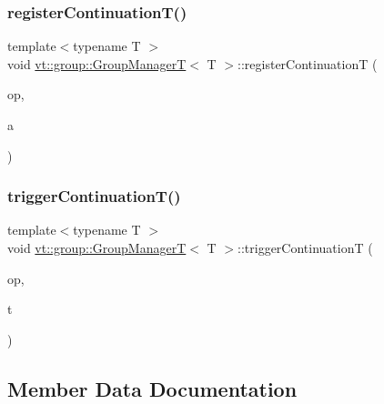 \subsubsection{\texorpdfstring{register\+Continuation\+T()}{registerContinuationT()}\hspace{0.1cm}{\footnotesize\ttfamily [2/2]}}
{\footnotesize\ttfamily template$<$typename T $>$ \\
void \hyperlink{structvt_1_1group_1_1_group_manager_t}{vt\+::group\+::\+Group\+ManagerT}$<$ T $>$\+::register\+ContinuationT (\begin{DoxyParamCaption}\item[{\hyperlink{namespacevt_1_1group_a73f2624ddeb535b39a08b6524f26b244}{Remote\+Operation\+I\+D\+Type} const \&}]{op,  }\item[{\hyperlink{structvt_1_1group_1_1_group_manager_t_acb20922687d3165d97de391fdbaf02ca}{Action\+T\+Type}}]{a }\end{DoxyParamCaption})\hspace{0.3cm}{\ttfamily [static]}}

\mbox{\label{structvt_1_1group_1_1_group_manager_t_a654b43bfc4360ba5c7f4a1680378bdad}} 
\subsubsection{\texorpdfstring{trigger\+Continuation\+T()}{triggerContinuationT()}}
{\footnotesize\ttfamily template$<$typename T $>$ \\
void \hyperlink{structvt_1_1group_1_1_group_manager_t}{vt\+::group\+::\+Group\+ManagerT}$<$ T $>$\+::trigger\+ContinuationT (\begin{DoxyParamCaption}\item[{\hyperlink{namespacevt_1_1group_a73f2624ddeb535b39a08b6524f26b244}{Remote\+Operation\+I\+D\+Type} const \&}]{op,  }\item[{T}]{t }\end{DoxyParamCaption})\hspace{0.3cm}{\ttfamily [static]}}



\subsection{Member Data Documentation}
\mbox{\label{structvt_1_1group_1_1_group_manager_t_ace6828eddb4d595c12ea5c07047207d6}} 
